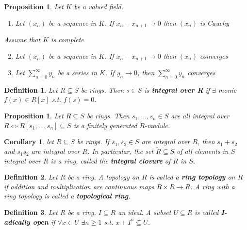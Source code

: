 \documentclass[a4paper]{article}
\newtheorem*{definition}{Definition}
\newtheorem{prop}[lemma]{Proposition}
\newtheorem{corollary}[lemma]{Corollary}
\begin{document}
\begin{prop}
	Let $K$ be a valued field.
	\begin{enumerate}[label=\roman*.]
		\item Let $(x_n)$ be a sequence in $K$. If $x_n - x_{n+1} \to 0$ then $(x_n)$ is Cauchy
	\end{enumerate}
	Assume that $K$ is complete
	\begin{enumerate}[label=\roman*.]
		\setcounter{enumi}{1}
		\item Let $(x_n)$ be a sequence in $K$. If $x_n - x_{n+1} \to 0$ then $(x_n)$ converges
		\item Let $\sum_{n=0}^{\infty}y_n$ be a series in $K$. If $y_n\to0$, then $\sum_{n=0}^{\infty}y_n$ converges
	\end{enumerate}
\end{prop}

\begin{definition}
	Let $R \subseteq S$ be rings. Then $s \in S$ is \textbf{integral over R} if $\exists$ monic $f(x) \in R[x]$ s.t. $f(s)=0$.
\end{definition}

\begin{prop}
	Let $R \subseteq S$ be rings. Then $s_1, \dots,s_n\in S$ are all integral over $R \iff R[s_1,\dots,s_n] \subseteq S$ is a finitely generated $R$-module.
\end{prop}

\begin{corollary}
	let $R \subseteq S$ be rings. If $s_1, s_2 \in S$ are integral over $R$, then $s_1+s_2$ and $s_1s_2$ are integral over $R$. In particular, the set $\tilde{R}\subseteq S$ of all elements in $S$ integral over $R$ is a ring, called the \textbf{integral closure} of $R$ in $S$.
\end{corollary}

\begin{definition}
	Let $R$ be a ring. A topology on $R$ is called a \textbf{ring topology} on $R$ if addition and multiplication are continuous maps $R\times R\to R$. A ring with a ring topology is called a \textbf{topological ring}.
\end{definition}

\begin{definition}
	Let $R$ be a ring, $I \subseteq R$ an ideal. A subset $U \subseteq R$ is called \linebreak \textbf{I-adically open} if $\forall x \in U$ $\exists n \geq 1$ s.t. $x + I^n \subseteq U$.
\end{definition}
\end{document}
